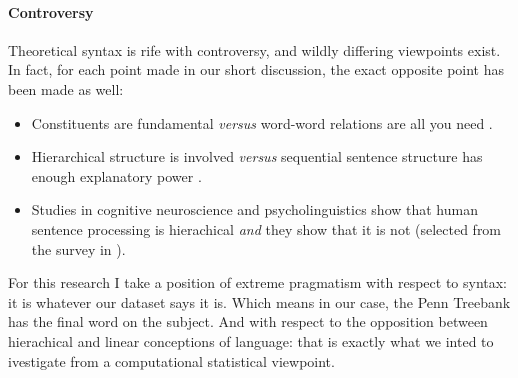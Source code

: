 \paragraph{Controversy}
Theoretical syntax is rife with controversy, and wildly differing viewpoints exist. In fact, for each point made in our short discussion, the exact opposite point has been made as well:
\begin{itemize}
  \item Constituents are fundamental \citep{huddleston2002grammar,carnie2010constituent} \textit{versus} word-word relations are all you need \citep{tesniere1959elements,nivre2005dependency,hudson2010introduction}.
  \item Hierarchical structure is involved \citep{Everaert+2015:structures} \textit{versus} sequential sentence structure has enough explanatory power \cite{Frank+2012:hierarchical}.
  \item Studies in cognitive neuroscience and psycholinguistics show that human sentence processing is hierachical \citep{hale2001earley,levy2008expectation,brennan2016abstract} \textit{and} they show that it is not \citep{conway2008neurocognitive,christiansen2012similar,gillespie2011hierarchy, gillespie2013against} (selected from the survey in \citet{Frank+2012:hierarchical}).
\end{itemize}
For this research I take a position of extreme pragmatism with respect to syntax: it is whatever our dataset says it is. Which means in our case, the Penn Treebank has the final word on the subject. And with respect to the opposition between hierachical and linear conceptions of language: that is exactly what we inted to ivestigate from a computational statistical viewpoint.

% 		  
%
% 		  
%



